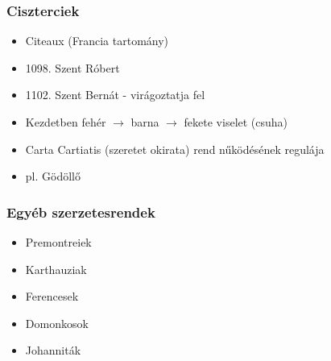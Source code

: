 \documentclass{article}
\begin{document}
\subsubsection{Ciszterciek}
\begin{itemize}
    \item Citeaux (Francia tartomány)
     \item 1098. Szent Róbert
     \item 1102. Szent Bernát - virágoztatja fel
     \item Kezdetben fehér $\rightarrow$ barna $\rightarrow$ fekete viselet (csuha)
     \item Carta Cartiatis (szeretet okirata) rend nűködésének regulája
     \item pl. Gödöllő
\end{itemize}

\subsubsection{Egyéb szerzetesrendek}
\begin{itemize}
    \item Premontreiek
    \item Karthauziak
    \item Ferencesek
    \item Domonkosok
    \item Johanniták
\end{itemize}
\end{document}
